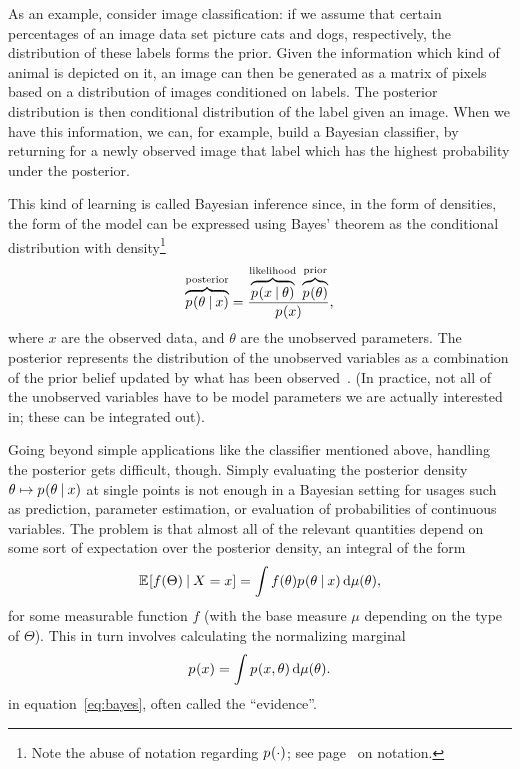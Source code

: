 As an example, consider image classification: if we assume that certain percentages of an image data
set picture cats and dogs, respectively, the distribution of these labels forms the prior.  Given
the information which kind of animal is depicted on it, an image can then be generated as a matrix
of pixels based on a distribution of images conditioned on labels.  The posterior distribution is
then conditional distribution of the label given an image.  When we have this information, we can,
for example, build a Bayesian classifier, by returning for a newly observed image that label which
has the highest probability under the posterior.

This kind of learning is called Bayesian inference since, in the form of densities, the form of the
model can be expressed using Bayes' theorem as the conditional distribution with
density\footnote{Note the abuse of notation regarding \(\prob{\cdot}\); see
  page~\pageref{cha:notation} on notation.}
\begin{equation}
  \label{eq:bayes}
  \overbrace{\prob{\theta \given x}}^{\text{posterior}} =
  \frac{\overbrace{\prob{x \given \theta}}^{\text{likelihood}}\;
    \overbrace{\prob{\theta}}^{\text{prior}}}{\prob{x}},
\end{equation}
where \(x\) are the observed data, and \(\theta\) are the unobserved parameters. The posterior
represents the distribution of the unobserved variables as a combination of the prior belief updated
by what has been observed~\parencite{congdon2006bayesian}.  (In practice, not all of the unobserved
variables have to be model parameters we are actually interested in; these can be integrated out).

Going beyond simple applications like the classifier mentioned above, handling the posterior gets
difficult, though.  Simply evaluating the posterior density
\(\theta \mapsto \prob{\theta \given x}\) at single points is not enough in a Bayesian setting for
usages such as prediction, parameter estimation, or evaluation of probabilities of continuous
variables.  The problem is that almost all of the relevant quantities depend on some sort of
expectation over the posterior density, an integral of the form
\begin{equation}
  \label{eq:posterior-expectation}
  \Exp{f(\Theta) \given X = x} = \int f(\theta) \prob{\theta \given x} \dif \mu(\theta),
\end{equation}
for some measurable function \(f\) (with the base measure \(\mu\) depending on the type of
\(\Theta\)). This in turn involves calculating the normalizing marginal
\begin{equation}
  \label{eq:normalizing}
  \prob{x} = \int \prob{x, \theta} \dif \mu(\theta).
\end{equation}
in equation~\eqref{eq:bayes}, often called the \enquote{evidence}.

